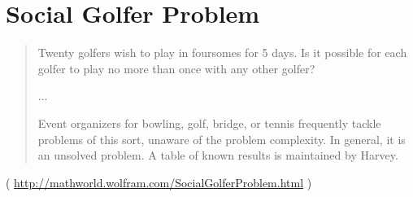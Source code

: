 \chapter{Social Golfer Problem}

\begin{framed}
\begin{quotation}
Twenty golfers wish to play in foursomes for 5 days. Is it possible for each golfer to play no more than once with any other golfer?

...

Event organizers for bowling, golf, bridge, or tennis frequently tackle problems of this sort, unaware of the problem complexity. In general, it is an unsolved problem. A table of known results is maintained by Harvey.
\end{quotation}
\end{framed}

( \url{http://mathworld.wolfram.com/SocialGolferProblem.html} )




